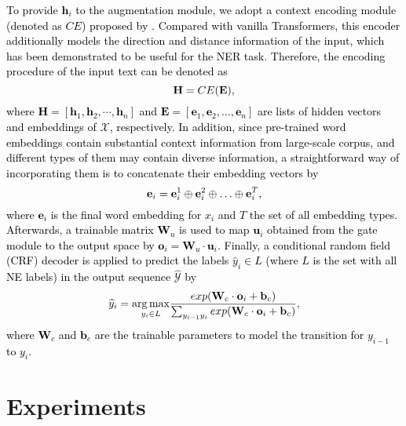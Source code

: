 \documentclass[11pt,a4paper]{article}
\begin{document}
\textcolor{black}{
To provide $\mathbf{h}_i$ to the augmentation module, we adopt a context encoding module (denoted as ${CE}$) proposed by \citet{DBLP:journals/corr/abs-1911-04474}.
Compared with vanilla Transformers, this encoder additionally models the direction and distance information of the input, which has been demonstrated to be useful for the NER task. 
Therefore, the encoding procedure of the input text can be denoted as
\begin{equation}
    \setlength\abovedisplayskip{5pt}
    \setlength\belowdisplayskip{5pt}
    \mathbf{H} = {CE}(\mathbf{E}),
\end{equation}
where $\mathbf{H} = [\mathbf{h}_1, \mathbf{h}_2, \cdots, \mathbf{h}_n]$ and $\mathbf{E} = [\mathbf{e}_1, \mathbf{e}_2, \ldots, \mathbf{e}_n]$ are lists of hidden vectors and embeddings of $\mathcal{X}$, respectively. 
In addition, since pre-trained word embeddings contain substantial context information from large-scale corpus, and different types of them may contain diverse information, a straightforward way of incorporating them is to concatenate their embedding vectors by
\begin{equation}
    \setlength\abovedisplayskip{5pt}
    \setlength\belowdisplayskip{5pt}
    \mathbf{e}_i = \mathbf{e}_i^1 \oplus \mathbf{e}_i^2 \oplus \ldots \oplus \mathbf{e}_i^T,
\end{equation}
where $\mathbf{e}_i$ is the final word embedding for $x_i$ and ${T}$ the set of all embedding types.
Afterwards, a trainable matrix $\mathbf{W}_u$ is used to map $\mathbf{u}_i$ obtained from the gate module to the output space by $\mathbf{o}_i = \mathbf{W}_u \cdot \mathbf{u}_i$.
Finally, a conditional random field (CRF) decoder is applied to predict the labels $\widehat{y}_{i} \in {L}$ (where ${L}$ is the set with all NE labels) in the output sequence $\widehat{\mathcal{Y}}$ by
\begin{equation} \label{eq:crf}
\setlength\abovedisplayskip{5pt}
\setlength\belowdisplayskip{5pt}
    \widehat{y}_{i} = \underset{y_{i} \in {L}}{\arg \max} \frac{ exp(\mathbf{W}_{c} \cdot \mathbf{o}_{i} + \mathbf{b}_{c})}
                    {\sum_{y_{i-1}y_{i}} exp(\mathbf{W}_{c} \cdot \mathbf{o}_{i} + \mathbf{b}_{c})},
\end{equation}
where $\mathbf{W}_{c}$ and $\mathbf{b}_{c}$ are the trainable parameters to model the transition for $y_{i-1}$ to $y_{i}$.
}

\section{Experiments}
\end{document}
